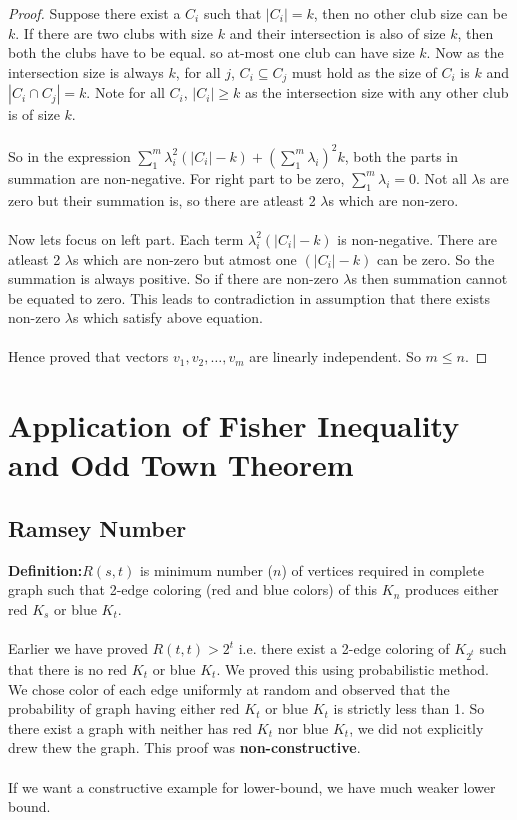 \begin{theorem}
\begin{proof}
Suppose there exist a $C_i$ such that $|C_i|=k$, then no other club size can be $k$. If there are two clubs with size $k$ and their intersection is also of size $k$, then both the clubs have to be equal. so at-most one club can have size $k$. Now as the intersection size is always $k$, for all $j$, $C_i \subseteq C_j$ must hold as the size of $C_i$ is $k$ and $|C_i \cap C_j |=k$. Note for all $C_i$, $|C_i|\ge k$ as the intersection size with any other club is of size $k$.\\\\
So in the expression $\sum_1^m \lambda_i^2 (|C_i|-k) +(\sum_1^m \lambda_i)^2k$, both the parts in summation are non-negative. For right part to be zero, $\sum_1^m \lambda_i =0$. Not all $\lambda$s are zero but their summation is, so there are atleast 2 $\lambda$s which are non-zero.\\\\
Now lets focus on left part. Each term $\lambda_i^2 (|C_i|-k)$ is non-negative.  There are atleast 2 $\lambda$s which are non-zero but atmost one $(|C_i|-k)$ can be zero. So the summation is always positive. So if there are non-zero $\lambda$s then summation cannot be equated to zero. This leads to contradiction in assumption that there exists non-zero $\lambda$s which satisfy above equation.\\\\
Hence proved that vectors $v_1, v_2, \hdots, v_m$ are linearly independent. So $m\le n$.
\end{proof}
\end{theorem}

\section{Application of Fisher Inequality and Odd Town Theorem}
\subsection{Ramsey Number}
\textbf{Definition:}$R(s,t)$ is minimum number ($n$) of vertices required in complete graph such that 2-edge coloring (red and blue colors) of this $K_n$ produces either red $K_s$ or blue $K_t$.\\\\
Earlier we have proved $R(t,t)>2^t$ i.e. there exist a 2-edge coloring of $K_{2^t}$ such that there is no red $K_t$ or blue $K_t$. We proved this using probabilistic method. We chose color of each edge uniformly at random and observed that the probability of graph having either red $K_t$ or blue $K_t$ is strictly less than 1. So there exist a graph with neither has red $K_t$ nor blue $K_t$, we did not explicitly drew thew the graph. This proof was \textbf{non-constructive}.\\\\
If we want a constructive example for lower-bound, we have much weaker lower bound.
